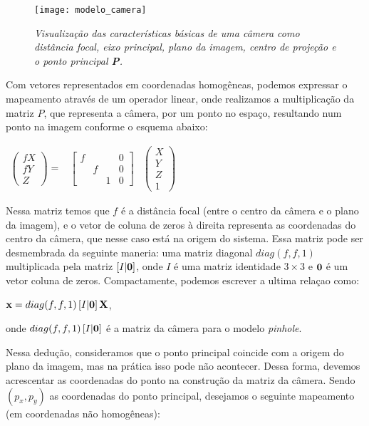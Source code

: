 \begin{figure}[!htb]
\centering
\texttt{[image: modelo\_camera]}
\caption{\textit{Visualização das características básicas de uma câmera como distância focal, eixo principal, plano da imagem, centro de projeção e o ponto principal {\bf P}.}}
\label{camera}
\end{figure}

Com vetores representados em coordenadas homogêneas, podemos expressar o mapeamento através de um operador linear, onde realizamos a multiplicação da matriz $P$, que representa a câmera, por um ponto no espaço, resultando num ponto na imagem conforme o esquema abaixo:

\begin{center}
$
\begin{array}{ccc}
\begin{pmatrix}
fX\\
fY\\
Z
\end{pmatrix} = 
&
\begin{bmatrix}
f& & &0\\
 &f& &0\\
 & &1&0
\end{bmatrix}
&
\begin{pmatrix}
X\\
Y\\
Z\\
1
\end{pmatrix}
\end{array}
$
\end{center}

Nessa matriz temos que $f$ é a distância focal (entre o centro da câmera e o plano da imagem), e o vetor de coluna de zeros à direita representa as coordenadas do centro da câmera, que nesse caso está na origem do sistema. Essa matriz pode ser desmembrada da seguinte maneria: uma matriz diagonal $diag(f,f,1)$ multiplicada pela matriz $[I|{\bf 0}]$, onde $I$ é uma matriz identidade $3\times3$ e ${\bf 0}$ é um vetor coluna de zeros. Compactamente, podemos escrever a ultima relaçao como:

\begin{center}
$\mathbf{x} = diag(f,f,1)\,[I|{\bf 0}]\,\mathbf{X}$,
\end{center}
onde $diag(f,f,1)\,[I|{\bf 0}]$ é a matriz da câmera para o modelo \textit{pinhole}.

Nessa dedução, consideramos que o ponto principal  coincide com a origem do plano da imagem, mas na prática isso pode não acontecer. Dessa forma, devemos acrescentar as coordenadas do ponto na construção da matriz da câmera. Sendo $(p_x,p_y)$ as coordenadas do ponto principal, desejamos o seguinte mapeamento (em coordenadas não homogêneas):

